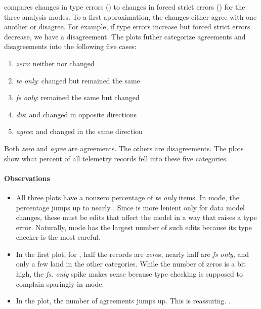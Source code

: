 \documentclass[english,submission,cleveref]{programming}
\begin{document}
 compares changes in type errors (\tekey{}) to changes in forced
strict errors (\fskey{}) for the three analysis modes.
To a first approximation, the changes either agree with one another
or disagree.
For example, if type errors increase but forced strict errors decrease,
we have a disagreement.
The plots futher categorize agreements and disagreements into
the following five cases:
\begin{enumerate}
  \item
    \emph{zero}: neither \tekey{} nor \fskey{} changed
  \item
    \emph{te only}: \tekey{} changed but \fskey{} remained the same
  \item 
    \emph{fs only}: \tekey{} remained the same but \fskey{} changed
  \item
    \emph{dis}: \tekey{} and \fskey{} changed in opposite directions
  \item 
    \emph{agree}: \tekey{} and \fskey{} changed in the same direction
\end{enumerate}
Both \emph{zero} and \emph{agree} are agreements.
The others are disagreements.
The plots show what percent of all telemetry records fell into these five categories.

\paragraph{Observations}

\begin{itemize}
  \item
    All three plots have a nonzero percentage of \emph{te only} items.
    In \mstrict{} mode, the percentage jumps up to nearly .
    Since \fskey{} is more lenient only for data model changes, these must
    be edits that affect the model in a way that raises a type error.
    Naturally, \mstrict{} mode has the largest number of such edits because
    its type checker is the most careful.

  \item
    In the first plot, for \mnocheck{},
    half the records are \emph{zero\/}s, nearly half are \emph{fs only}, and only a few
    land in the other categories.
    While the number of zeros is a bit high,
    the \emph{fs. only} spike makes sense because type checking is supposed to complain
    sparingly in \mnocheck{} mode.

  \item
    In the \mnonstrict{} plot, the number of agreements jumps up.
    This is reassuring.
    \FILL{}.

\end{itemize}
\end{document}
